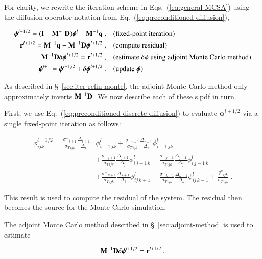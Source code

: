 \documentclass[preprint,12pt]{elsarticle}
\newcommand{\vr}{\ensuremath{\ve{r}}}
\newcommand{\vI}{\ensuremath{\ve{I}}}
\newcommand{\qn}{\ensuremath{q^n}}
\newcommand{\Di}{\ensuremath{\Delta_i}}
\newcommand{\Dj}{\ensuremath{\Delta_j}}
\newcommand{\Dk}{\ensuremath{\Delta_k}}
\newcommand{\sigT}{\ensuremath{\sigma_{T\,ijk}}}
\newcommand{\sigm}{\ensuremath{\sigma^{-}}}
\newcommand{\sigp}{\ensuremath{\sigma^{+}}}
\newcommand{\bphi}{\ensuremath{\boldsymbol{\phi}}}
\begin{document}
For clarity, we rewrite the iteration scheme in
Eqs.~(\ref{eq:general-MCSA}) using the diffusion operator notation
from Eq.~(\ref{eq:preconditioned-diffusion}),

\begin{align*}
  \bphi^{l+1/2} = (\vI - \ve{M}^{-1}\ve{D})\bphi^{l} +
  \ve{M}^{-1}\ve{q}\:, \quad & (\text{fixed-point iteration})\\
  \vr^{l+1/2} = \ve{M}^{-1}\ve{q} - \ve{M}^{-1}\ve{D}\bphi^{l+1/2}\:,
  \quad & (\text{compute residual})\\
  \ve{M}^{-1}\ve{D}\delta\bphi^{l+1/2} = \vr^{l+1/2}\:, \quad&
  (\text{estimate $\delta\phi$ using adjoint Monte Carlo method})\\
  \bphi^{l+1} = \bphi^{l+1/2} + \delta\bphi^{l+1/2}\:. \quad&
  (\text{update}\ \bphi)
\end{align*}

As described in \S~\ref{sec:iter-refin-monte}, the adjoint Monte Carlo
method only approximately inverts $\mathbf{M}^{-1}\mathbf{D}$.  We now
describe each of these s.pdf in turn.

First, we use Eq.~(\ref{eq:preconditioned-discrete-diffusion}) to
evaluate $\bphi^{l+1/2}$ via a single fixed-point iteration as
follows:

\begin{equation}
  \begin{aligned}
    \phi_{ijk}^{l+1/2} =  
    \frac{\sigm_{i+1}}{\sigT}\frac{\Delta_{i+1}}{\Di}&\phi_{i+1\,jk}^l
    +
    \frac{\sigp_{i-1}}{\sigT}\frac{\Delta_{i-1}}{\Di}\phi_{i-1\,jk}^l \\
    &+ \frac{\sigm_{j+1}}{\sigT}\frac{\Delta_{j+1}}{\Dj}\phi_{i\,j+1\,k}^l 
    + \frac{\sigp_{j-1}}{\sigT}\frac{\Delta_{j-1}}{\Dj}\phi_{i\,j-1\,k}^l \\
    &+ \frac{\sigm_{k+1}}{\sigT}\frac{\Delta_{k+1}}{\Dk}\phi_{ij\,k+1}^l
    + \frac{\sigp_{k-1}}{\sigT}\frac{\Delta_{k-1}}{\Dk}\phi_{ij\,k-1}^l
    + \frac{\qn_{ijk}}{\sigT}\:.
  \end{aligned}
\end{equation}

This result is used to compute the residual of the system.  The
residual then becomes the source for the Monte Carlo simulation.

The adjoint Monte Carlo method described in
\S~\ref{sec:adjoint-method} is used to estimate

\begin{equation}
  \ve{M}^{-1}\ve{D}\delta\bphi^{l+1/2} = \vr^{l+1/2}\:.
\end{equation}
\end{document}
